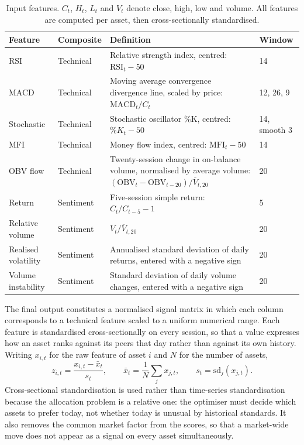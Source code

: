 \documentclass{singlecol-new}
\theoremstyle{TH}{
\newtheorem{lemma}{Lemma}
\newtheorem{theorem}[lemma]{Theorem}
\newtheorem{corrolary}[lemma]{Corrolary}
\newtheorem{conjecture}[lemma]{Conjecture}
\newtheorem{proposition}[lemma]{Proposition}
\newtheorem{claim}[lemma]{Claim}
\newtheorem{stheorem}[lemma]{Wrong Theorem}
\newtheorem{algorithm}{Algorithm}
}
\theoremstyle{THrm}{
\newtheorem{definition}{Definition}[section]
\newtheorem{question}{Question}[section]
\newtheorem{remark}{Remark}
\newtheorem{scheme}{Scheme}
}
\theoremstyle{THhit}{
\newtheorem{case}{Case}[section]
}
\begin{document}
\begin{table}[!ht]
\centering
\caption{Input features. $C_t$, $H_t$, $L_t$ and $V_t$ denote close, high, low and
volume. All features are computed per asset, then cross-sectionally standardised.}
\label{tab:features}
\footnotesize
\begin{tabular}{p{2.0cm}p{1.8cm}p{5.2cm}p{1.5cm}}
\hline
\textbf{Feature} & \textbf{Composite} & \textbf{Definition} & \textbf{Window} \\
\hline
RSI & Technical & Relative strength index, centred: $\mathrm{RSI}_t - 50$ & 14 \\
\hline
MACD & Technical & Moving average convergence divergence line, scaled by price: $\mathrm{MACD}_t / C_t$ & 12, 26, 9 \\
\hline
Stochastic & Technical & Stochastic oscillator \%K, centred: $\%K_t - 50$ & 14, smooth 3 \\
\hline
MFI & Technical & Money flow index, centred: $\mathrm{MFI}_t - 50$ & 14 \\
\hline
OBV flow & Technical & Twenty-session change in on-balance volume, normalised by average volume: $(\mathrm{OBV}_t - \mathrm{OBV}_{t-20}) / \overline{V}_{t,20}$ & 20 \\
\hline
Return & Sentiment & Five-session simple return: $C_t / C_{t-5} - 1$ & 5 \\
\hline
Relative volume & Sentiment & $V_t / \overline{V}_{t,20}$ & 20 \\
\hline
Realised volatility & Sentiment & Annualised standard deviation of daily returns, entered with a negative sign & 20 \\
\hline
Volume instability & Sentiment & Standard deviation of daily volume changes, entered with a negative sign & 20 \\
\hline
\end{tabular}
\end{table}

The final output constitutes a normalised signal matrix in which each column corresponds
to a technical feature scaled to a uniform numerical range. Each feature is standardised
cross-sectionally on every session, so that a value expresses how an asset ranks against
its peers that day rather than against its own history. Writing $x_{i,t}$ for the raw
feature of asset $i$ and $N$ for the number of assets,
\begin{equation}
z_{i,t} = \frac{x_{i,t} - \bar{x}_t}{s_t}, \qquad
\bar{x}_t = \frac{1}{N}\sum_{j} x_{j,t}, \qquad
s_t = \mathrm{sd}_j(x_{j,t}).
\end{equation}
Cross-sectional standardisation is used rather than time-series standardisation because
the allocation problem is a relative one: the optimiser must decide which assets to
prefer today, not whether today is unusual by historical standards. It also removes the
common market factor from the scores, so that a market-wide move does not appear as a
signal on every asset simultaneously.
\end{document}
